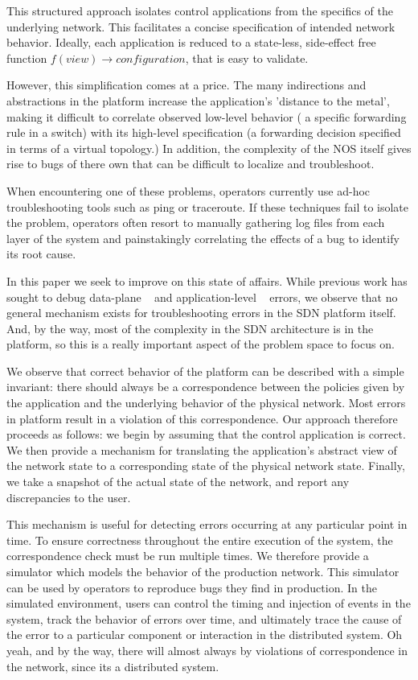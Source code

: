 This structured approach isolates control applications from the specifics
of the underlying network. This facilitates a concise specification of
intended network behavior. Ideally, each application is reduced to a
state-less, side-effect free function $f(view) \rightarrow configuration$, that is
easy to validate.

However, this simplification comes at a price. The 
many indirections and abstractions in the platform increase the application's 'distance to
the metal', making it difficult to correlate observed low-level behavior
(\eg{} a specific forwarding rule in a switch) with its high-level specification
(a forwarding decision specified in terms of a virtual topology.) In addition, the
complexity of the NOS itself gives rise to bugs of there own that can be
difficult to localize and troubleshoot. 

When encountering one of these problems, operators currently use ad-hoc troubleshooting
tools such as ping or traceroute. If these techniques fail to isolate the problem, operators often resort to
manually gathering log files from each layer of the system and painstakingly
correlating the effects of a bug to identify its root cause.

In this paper we seek to improve on this state of affairs. While previous work
has sought to debug data-plane ~\cite{anteater} and application-level ~\cite{canini}
errors, we observe that no general mechanism exists for troubleshooting errors
in the SDN platform itself. And, by the way, most of the complexity in the SDN architecture is in the platform,
so this is a really important aspect of the problem space to focus on.

We observe that correct behavior of the platform can be described with a
simple invariant: there should always be a correspondence between the policies 
given by the application and the underlying behavior of the physical network.
Most errors in platform result in a violation of this correspondence.
Our approach therefore proceeds as follows: we begin by assuming that the 
control application is correct. We then provide a mechanism for translating
the application's abstract view of the network state to a corresponding
state of the physical network state. Finally, we take a snapshot of the actual
state of the network, and report any discrepancies to the user.

This mechanism is useful for detecting errors occurring at any particular point
in time. To ensure correctness throughout the entire execution of the system,
the correspondence check must be run multiple times. We therefore provide a
simulator which models the behavior of the production network. This simulator
can be used by operators to reproduce bugs they find in production. In the
simulated environment, users can control the timing and injection of events in the system, track the behavior of errors over
time, and ultimately trace the cause of the error to a particular component or
interaction in the distributed system. Oh yeah, and by the way, there will
almost always by violations of correspondence in the network, since its a
distributed system.

